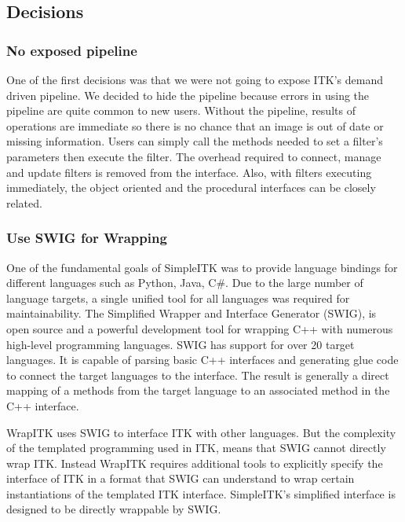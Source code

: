 \documentclass{frontiersMED} %
\begin{document}
\subsection{Decisions}
\subsubsection{No exposed pipeline}
One of the first decisions was that we were not going to expose ITK's
demand driven pipeline. We decided to hide the pipeline because errors
in using the pipeline are quite common to new users. Without the
pipeline, results of operations are immediate so there is no chance
that an image is out of date or missing information. Users can simply
call the methods needed to set a filter's parameters then execute the
filter.  The overhead required to connect, manage and update filters
is removed from the interface. Also, with filters executing
immediately, the object oriented and the procedural interfaces can be
closely related.

\subsubsection{Use SWIG for Wrapping}
One of the fundamental goals of SimpleITK was to provide language
bindings for different languages such as Python, Java, C\#. Due to the
large number of language targets, a single unified tool for all
languages was required for maintainability. The Simplified Wrapper and
Interface Generator (SWIG), is open source and a powerful
development tool for wrapping C++ with numerous high-level programming
languages. SWIG has support for over 20 target languages. It is
capable of parsing basic C++ interfaces and generating glue code to
connect the target languages to the interface. The result is generally
a direct mapping of a methods from the target language to an
associated method in the C++ interface.

WrapITK uses SWIG to interface ITK with other languages.  But the
complexity of the templated programming used in ITK, means that SWIG
cannot directly wrap ITK.  Instead WrapITK requires additional tools
to explicitly specify the interface of ITK in a format that SWIG can
understand to wrap certain instantiations of the templated ITK
interface. SimpleITK's simplified interface is designed to be directly
wrappable by SWIG.
\end{document}

